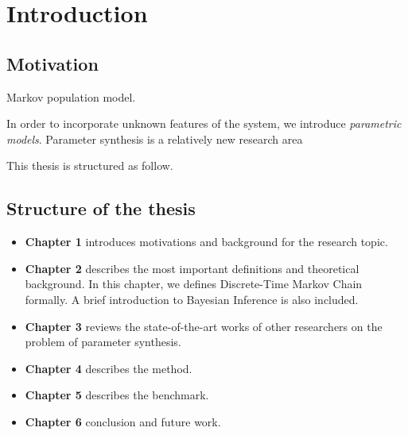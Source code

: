 \chapter{Introduction}
\section{Motivation}

Markov population model.

In order to incorporate unknown features of the system, we introduce \textit{parametric models}. Parameter synthesis is a relatively new research area \cite{katoen2016probabilistic}

This thesis is structured as follow.

\section{Structure of the thesis}
\begin{itemize}
  \item \textbf{Chapter 1} introduces motivations and background for the research topic.
  \item \textbf{Chapter 2} describes the most important definitions and
        theoretical background. In this chapter, we defines Discrete-Time Markov Chain
        formally. A brief introduction to Bayesian Inference is also included.
  \item \textbf{Chapter 3} reviews the state-of-the-art works of other researchers
        on the problem of parameter synthesis.
  \item \textbf{Chapter 4} describes the method.
  \item \textbf{Chapter 5} describes the benchmark.
  \item \textbf{Chapter 6} conclusion and future work.
\end{itemize}

